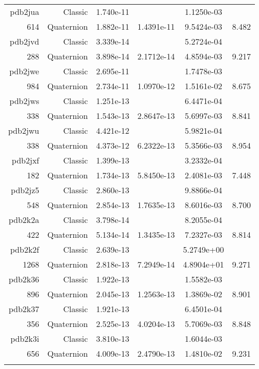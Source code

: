\begin{xltabular}{\textwidth}{r|rS[table-format=1.3e+2]S[table-format=1.4e+2]S[table-format=1.4e+2]S[table-format=-1.3]}
pdb2jua & Classic & 1.740e-11 &  & 1.1250e-03 & \\
614 & Quaternion & 1.882e-11 & 1.4391e-11 & 9.5424e-03 & 8.482\\  \addlinespace
pdb2jvd & Classic & 3.339e-14 &  & 5.2724e-04 & \\
288 & Quaternion & 3.898e-14 & 2.1712e-14 & 4.8594e-03 & 9.217\\  \addlinespace
pdb2jwe & Classic & 2.695e-11 &  & 1.7478e-03 & \\
984 & Quaternion & 2.734e-11 & 1.0970e-12 & 1.5161e-02 & 8.675\\  \addlinespace
pdb2jws & Classic & 1.251e-13 &  & 6.4471e-04 & \\
338 & Quaternion & 1.543e-13 & 2.8647e-13 & 5.6997e-03 & 8.841\\  \addlinespace
pdb2jwu & Classic & 4.421e-12 &  & 5.9821e-04 & \\
338 & Quaternion & 4.373e-12 & 6.2322e-13 & 5.3566e-03 & 8.954\\  \addlinespace
pdb2jxf & Classic & 1.399e-13 &  & 3.2332e-04 & \\
182 & Quaternion & 1.734e-13 & 5.8450e-13 & 2.4081e-03 & 7.448\\  \addlinespace
pdb2jz5 & Classic & 2.860e-13 &  & 9.8866e-04 & \\
548 & Quaternion & 2.854e-13 & 1.7635e-13 & 8.6016e-03 & 8.700\\  \addlinespace
pdb2k2a & Classic & 3.798e-14 &  & 8.2055e-04 & \\
422 & Quaternion & 5.134e-14 & 1.3435e-13 & 7.2327e-03 & 8.814\\  \addlinespace
pdb2k2f & Classic & 2.639e-13 &  & 5.2749e+00 & \\
1268 & Quaternion & 2.818e-13 & 7.2949e-14 & 4.8904e+01 & 9.271\\  \addlinespace
pdb2k36 & Classic & 1.922e-13 &  & 1.5582e-03 & \\
896 & Quaternion & 2.045e-13 & 1.2563e-13 & 1.3869e-02 & 8.901\\  \addlinespace
pdb2k37 & Classic & 1.921e-13 &  & 6.4501e-04 & \\
356 & Quaternion & 2.525e-13 & 4.0204e-13 & 5.7069e-03 & 8.848\\  \addlinespace
pdb2k3i & Classic & 3.810e-13 &  & 1.6044e-03 & \\
656 & Quaternion & 4.009e-13 & 2.4790e-13 & 1.4810e-02 & 9.231\\  \addlinespace

\end{xltabular}
